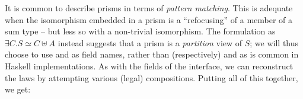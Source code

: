 \documentclass[sigplan,review,anonymous]{acmart}
\begin{document}
It is common to describe prisms in terms of \emph{pattern matching}. This is
adequate when the isomorphism embedded in a prism is a ``refocusing'' of
a member of a sum type -- but less so with a non-trivial isomorphism. The
formulation as $∃C. S ≃ C ⊎ A$ instead suggests that a prism is a
\emph{partition} view of $S$; we will thus choose to use 
and  as field names, rather than (respectively)
 and  as is common in Haskell implementations.
As with the fields of the interface, we can reconstruct the laws by attempting
various (legal) compositions. Putting all of this together, we get:
\begin{code}%
\>[0]\AgdaSpace{}%
\AgdaSpace{}%
\AgdaSymbol{\{}\AgdaSpace{}%
\AgdaSpace{}%
\AgdaSymbol{:}\AgdaSpace{}%
\AgdaSymbol{\}}\AgdaSpace{}%
\AgdaSymbol{(}\AgdaSpace{}%
\AgdaSymbol{:}\AgdaSpace{}%
\AgdaSpace{}%
\AgdaSymbol{)}\AgdaSpace{}%
\AgdaSymbol{(}\AgdaSpace{}%
\AgdaSymbol{:}\AgdaSpace{}%
\AgdaSpace{}%
\AgdaSymbol{)}\AgdaSpace{}%
\AgdaSymbol{:}\AgdaSpace{}%
\AgdaSpace{}%
\AgdaSymbol{(}\AgdaSpace{}%
\AgdaSpace{}%
\AgdaSymbol{)}\AgdaSpace{}%
\<%
\\
\>[0][@{}l@{\AgdaIndent{0}}]%
\>[2]\<%
\\
\>[2][@{}l@{\AgdaIndent{0}}]%
\>[4]%
\>[15]\AgdaSymbol{:}\AgdaSpace{}%
\AgdaSpace{}%
\AgdaSpace{}%
\AgdaSpace{}%
\<%
\\
%
\>[4]%
\>[15]\AgdaSymbol{:}\AgdaSpace{}%
\AgdaSpace{}%
\AgdaSpace{}%
\<%
\\
%
\>[4]\AgdaSpace{}%
\AgdaSymbol{:}\AgdaSpace{}%
\AgdaSymbol{(}\AgdaSpace{}%
\AgdaSymbol{:}\AgdaSpace{}%
\AgdaSymbol{)}\AgdaSpace{}%
\AgdaSpace{}%
\AgdaSpace{}%
\AgdaSymbol{(}\AgdaSpace{}%
\AgdaSymbol{)}\AgdaSpace{}%
\AgdaSpace{}%
\AgdaSpace{}%
\<%
\\
%
\>[4]\AgdaSpace{}%
\AgdaSymbol{:}\AgdaSpace{}%
\AgdaSymbol{(}\AgdaSpace{}%
\AgdaSymbol{:}\AgdaSpace{}%
\AgdaSymbol{)}\AgdaSpace{}%
\AgdaSpace{}%
\AgdaSymbol{(}\AgdaSpace{}%
\AgdaSymbol{:}\AgdaSpace{}%
\AgdaSymbol{)}\AgdaSpace{}%
\AgdaSpace{}%
\AgdaSymbol{(}\AgdaSpace{}%
\AgdaSpace{}%
\AgdaSpace{}%
\AgdaSpace{}%
\AgdaSpace{}%
\AgdaSpace{}%
\AgdaSpace{}%
\AgdaSpace{}%
\AgdaSpace{}%
\AgdaSymbol{)}\<%
\end{code}
\end{document}
